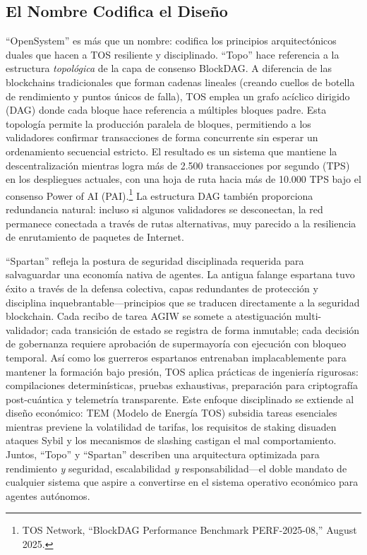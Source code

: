 \documentclass[11pt]{article}
\begin{document}
\subsection{El Nombre Codifica el Diseño}
``OpenSystem'' es más que un nombre: codifica los principios arquitectónicos duales que hacen a TOS resiliente y disciplinado. ``Topo'' hace referencia a la estructura \emph{topológica} de la capa de consenso BlockDAG. A diferencia de las blockchains tradicionales que forman cadenas lineales (creando cuellos de botella de rendimiento y puntos únicos de falla), TOS emplea un grafo acíclico dirigido (DAG) donde cada bloque hace referencia a múltiples bloques padre. Esta topología permite la producción paralela de bloques, permitiendo a los validadores confirmar transacciones de forma concurrente sin esperar un ordenamiento secuencial estricto. El resultado es un sistema que mantiene la descentralización mientras logra más de 2.500 transacciones por segundo (TPS) en los despliegues actuales, con una hoja de ruta hacia más de 10.000 TPS bajo el consenso Power of AI (PAI).\footnote{TOS Network, ``BlockDAG Performance Benchmark PERF-2025-08,'' August 2025.} La estructura DAG también proporciona redundancia natural: incluso si algunos validadores se desconectan, la red permanece conectada a través de rutas alternativas, muy parecido a la resiliencia de enrutamiento de paquetes de Internet.

``Spartan'' refleja la postura de seguridad disciplinada requerida para salvaguardar una economía nativa de agentes. La antigua falange espartana tuvo éxito a través de la defensa colectiva, capas redundantes de protección y disciplina inquebrantable---principios que se traducen directamente a la seguridad blockchain. Cada recibo de tarea AGIW se somete a atestiguación multi-validador; cada transición de estado se registra de forma inmutable; cada decisión de gobernanza requiere aprobación de supermayoría con ejecución con bloqueo temporal. Así como los guerreros espartanos entrenaban implacablemente para mantener la formación bajo presión, TOS aplica prácticas de ingeniería rigurosas: compilaciones determinísticas, pruebas exhaustivas, preparación para criptografía post-cuántica y telemetría transparente. Este enfoque disciplinado se extiende al diseño económico: TEM (Modelo de Energía TOS) subsidia tareas esenciales mientras previene la volatilidad de tarifas, los requisitos de staking disuaden ataques Sybil y los mecanismos de slashing castigan el mal comportamiento. Juntos, ``Topo'' y ``Spartan'' describen una arquitectura optimizada para rendimiento \emph{y} seguridad, escalabilidad \emph{y} responsabilidad---el doble mandato de cualquier sistema que aspire a convertirse en el sistema operativo económico para agentes autónomos.
\end{document}
